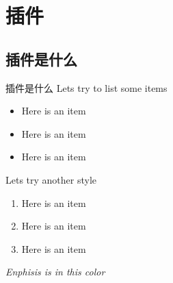 \section{插件}
\subsection{插件是什么}
\begin{frame}{插件是什么}
    Lets try to list some items
    \begin{itemize}
        \item Here is an item
        \item Here is an item
        \item Here is an item
    \end{itemize}

    \vspace{0.4cm} %
    
    Lets try another style
    \begin{enumerate}
        \item Here is an item
        \item Here is an item
        \item Here is an item
    \end{enumerate}

    \vspace{0.2cm}

     \emph{Enphisis is in this color}
\end{frame}